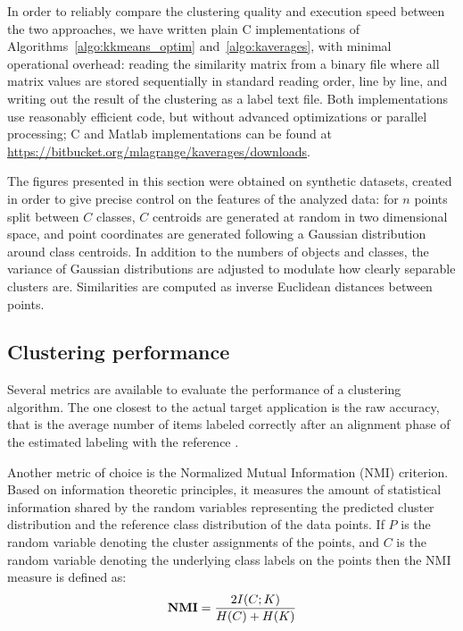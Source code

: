 \documentclass[twoside,11pt]{article}
\begin{document}
In order to reliably compare the clustering quality and execution speed between the two approaches, we have written plain C implementations of Algorithms~\ref{algo:kkmeans_optim} and~\ref{algo:kaverages}, with minimal operational overhead: reading the similarity matrix from a binary file where all matrix values are stored sequentially in standard reading order, line by line, and writing out the result of the clustering as a label text file. Both implementations use reasonably efficient code, but without advanced optimizations or parallel processing; C and Matlab implementations can be found at\\ \url{https://bitbucket.org/mlagrange/kaverages/downloads}.	%

The figures presented in this section were obtained on synthetic datasets, created in order to give precise control on the features of the analyzed data: for $n$ points split between $C$ classes, $C$ centroids are generated at random in two dimensional space, and point coordinates are generated following a Gaussian distribution around class centroids. In addition to the numbers of objects and classes, the variance of Gaussian distributions are adjusted to modulate how clearly separable clusters are. Similarities are computed as inverse Euclidean distances between points. %

\subsection{Clustering performance}

Several metrics are available to evaluate the performance of a clustering algorithm. The one closest to the actual target application is the raw accuracy, that is the average number of items labeled correctly after an alignment phase of the estimated labeling with the reference \citep{Kuhn1955Hungarian}.

Another metric of choice is the Normalized Mutual Information (NMI) criterion. Based on information theoretic principles, it measures the amount of statistical information shared by the random variables representing the predicted cluster distribution and the reference class distribution of the data points. If $P$ is the random variable denoting the cluster assignments of the points, and $C$ is the random variable denoting the underlying class labels on the points then the NMI measure is defined as:
\[
\textbf{NMI} = \frac{ 2\- I(C;K) }{H(C)+H(K)}
\]
\end{document}
